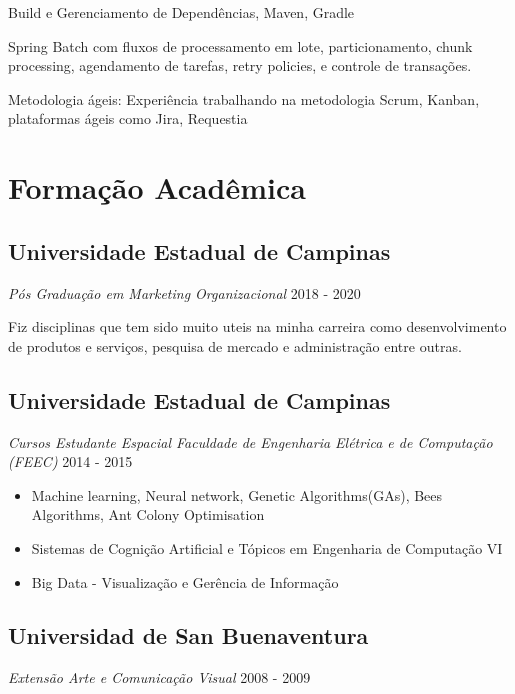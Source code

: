 \documentclass[a4paper,10pt]{article}
\begin{document}
Build e Gerenciamento de Dependências, Maven, Gradle

Spring Batch com fluxos de processamento em lote,
particionamento,
chunk processing,
agendamento de tarefas, retry policies,
e controle de transações.

\textcolor{corSubSection}{Metodologia ágeis:}
Experiência trabalhando na metodologia Scrum, Kanban, plataformas ágeis como Jira, Requestia


\clearpage
\section*{Formação Acadêmica}
\noindent\makebox[\linewidth]{\rule{\linewidth}{0.1mm}\textcolor{corLarge}{}}

\subsection*{Universidade Estadual de Campinas}
\textcolor{corSubSection}{\emph{Pós Graduação em Marketing Organizacional}}
\hfill \textcolor{corSubSection}{2018 - 2020}

Fiz disciplinas que tem sido muito uteis na minha carreira como
desenvolvimento de produtos e serviços,
pesquisa de mercado e administração entre outras.

\subsection*{Universidade Estadual de Campinas}
\textcolor{corSubSection}{\emph{Cursos Estudante Espacial Faculdade de Engenharia Elétrica e de Computação (FEEC)}}
\hfill \textcolor{corSubSection}{2014 - 2015}

\begin{itemize}
    \item Machine learning, Neural network, Genetic Algorithms(GAs), Bees Algorithms, Ant Colony Optimisation
    \item Sistemas de Cognição Artificial e Tópicos em Engenharia de Computação VI
    \item Big Data - Visualização e Gerência de Informação
\end{itemize}

\subsection*{Universidad de San Buenaventura}
\textcolor{corSubSection}{\emph{Extensão Arte e Comunicação Visual}}
\hfill \textcolor{corSubSection}{2008 - 2009}
\end{document}
